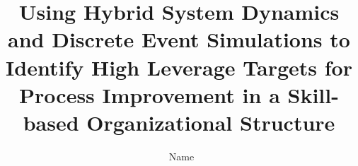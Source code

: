 

\title{\LARGE{\texorpdfstring{%
Using Hybrid System Dynamics and Discrete Event Simulations to Identify High Leverage Targets for Process Improvement in a Skill-based Organizational Structure
}{%
PDF Title
}}}

\author{\texorpdfstring{{\scalebox{0.9}{\faUser}}~Name}{PDF Name}}




\newcommand*{\tran}{^{\intercal}}

\renewcommand{\ULdepth}{1.8pt}
\contourlength{0.8pt}

\newcommand{\myuline}[1]{%
  \uline{\phantom{#1}}%
  \llap{\contour{white}{#1}}%
}


\newcommand{\sessiontaskremark}{%
\begin{myimportant}

\begin{itemize}

\item Submit a document (.pdf \scalebox{0.9}{\faFilePdf} or .doc/x \scalebox{0.9}{\faFileWord}) summarizing your answers to the questions

\item Submit all code used to answer the questions

\item A .zip \scalebox{0.9}{\faFileArchive} file containing these files is preferred if you have multiple files

\item Please provide guidance on how I should review your submission if there are many files

\end{itemize}

\end{myimportant}%
}%

